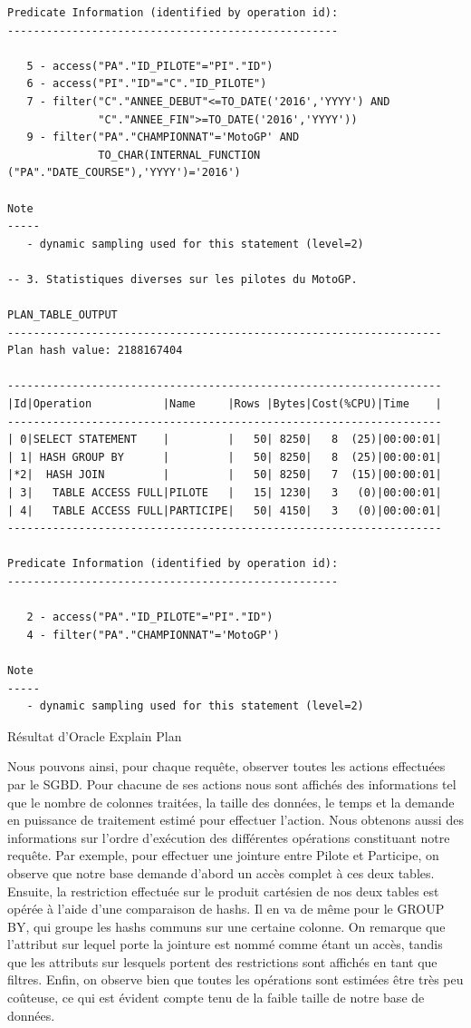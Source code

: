 \documentclass[12pt,a4paper]{article}
\newenvironment{code}{\captionsetup{type=listing}}{}
\begin{document}
\begin{code}
\begin{verbatim}
Predicate Information (identified by operation id):
---------------------------------------------------

   5 - access("PA"."ID_PILOTE"="PI"."ID")
   6 - access("PI"."ID"="C"."ID_PILOTE")
   7 - filter("C"."ANNEE_DEBUT"<=TO_DATE('2016','YYYY') AND
              "C"."ANNEE_FIN">=TO_DATE('2016','YYYY'))
   9 - filter("PA"."CHAMPIONNAT"='MotoGP' AND
              TO_CHAR(INTERNAL_FUNCTION ("PA"."DATE_COURSE"),'YYYY')='2016')

Note
-----
   - dynamic sampling used for this statement (level=2)
   
-- 3. Statistiques diverses sur les pilotes du MotoGP.

PLAN_TABLE_OUTPUT
-------------------------------------------------------------------
Plan hash value: 2188167404

-------------------------------------------------------------------
|Id|Operation           |Name     |Rows |Bytes|Cost(%CPU)|Time    |
-------------------------------------------------------------------
| 0|SELECT STATEMENT    |         |   50| 8250|   8  (25)|00:00:01|
| 1| HASH GROUP BY      |         |   50| 8250|   8  (25)|00:00:01|
|*2|  HASH JOIN         |         |   50| 8250|   7  (15)|00:00:01|
| 3|   TABLE ACCESS FULL|PILOTE   |   15| 1230|   3   (0)|00:00:01|
| 4|   TABLE ACCESS FULL|PARTICIPE|   50| 4150|   3   (0)|00:00:01|
-------------------------------------------------------------------

Predicate Information (identified by operation id):
---------------------------------------------------

   2 - access("PA"."ID_PILOTE"="PI"."ID")
   4 - filter("PA"."CHAMPIONNAT"='MotoGP')

Note
-----
   - dynamic sampling used for this statement (level=2)

    \end{verbatim}
    \caption{Résultat d'Oracle Explain Plan}
    \label{lst.expplan.res}
\end{code}

Nous pouvons ainsi, pour chaque requête, observer toutes les actions effectuées
par le SGBD. Pour chacune de ses actions nous sont affichés des informations tel
que le nombre de colonnes traitées, la taille des données, le temps et la
demande en puissance de traitement estimé pour effectuer l’action. Nous obtenons
aussi des informations sur l’ordre d’exécution des différentes opérations
constituant notre requête. Par exemple, pour effectuer une jointure entre Pilote
et Participe, on observe que notre base demande d’abord un accès complet à ces
deux tables. Ensuite, la restriction effectuée sur le produit cartésien de nos
deux tables est opérée à l’aide d’une comparaison de hashs. Il en va de même
pour le GROUP BY, qui groupe les hashs communs sur une certaine colonne. On
remarque que l'attribut sur lequel porte la jointure est nommé comme étant un
accès, tandis que les attributs sur lesquels portent des restrictions sont
affichés en tant que filtres. Enfin, on observe bien que toutes les opérations
sont estimées être très peu coûteuse, ce qui est évident compte tenu de la
faible taille de notre base de données.
\end{document}

